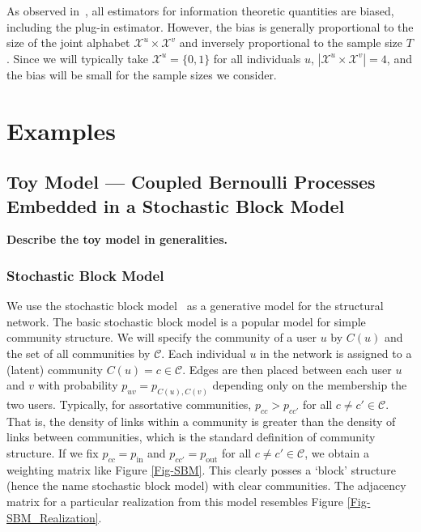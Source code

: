\documentclass[12pt]{article}
\begin{document}
As observed in~\cite{paninski2003estimation}, all estimators for information theoretic quantities are biased, including the plug-in estimator. However, the bias is generally proportional to the size of the joint alphabet $\mathcal{X}^{u} \times \mathcal{X}^{v}$ and inversely proportional to the sample size $T$. Since we will typically take $\mathcal{X}^{u} = \{0, 1\}$ for all individuals $u$, $|\mathcal{X}^{u} \times \mathcal{X}^{v}| = 4$, and the bias will be small for the sample sizes we consider.

\section{Examples}

\subsection{Toy Model --- Coupled Bernoulli Processes Embedded in a Stochastic Block Model}

\textbf{Describe the toy model in generalities.}

\subsubsection{Stochastic Block Model}

We use the stochastic block model~\cite{holland1983stochastic} as a generative model for the structural network. The basic stochastic block model is a popular model for simple community structure. We will specify the community of a user $u$ by $C(u)$ and the set of all communities by $\mathcal{C}$. Each individual $u$ in the network is assigned to a (latent) community $C(u) = c \in \mathcal{C}$. Edges are then placed between each user $u$ and $v$ with probability $p_{uv} = p_{C(u), C(v)}$ depending only on the membership the two users. Typically, for assortative communities, $p_{cc} > p_{cc'}$ for all $c \neq c' \in \mathcal{C}$. That is, the density of links within a community is greater than the density of links between communities, which is the standard definition of community structure. If we fix $p_{cc} = p_{\text{in}}$ and $p_{cc'} = p_{\text{out}}$ for all $c \neq c' \in \mathcal{C}$, we obtain a weighting matrix like Figure \ref{Fig-SBM}. This clearly posses a `block' structure (hence the name stochastic block model) with clear communities. The adjacency matrix for a particular realization from this model resembles Figure \ref{Fig-SBM_Realization}.
\end{document}
